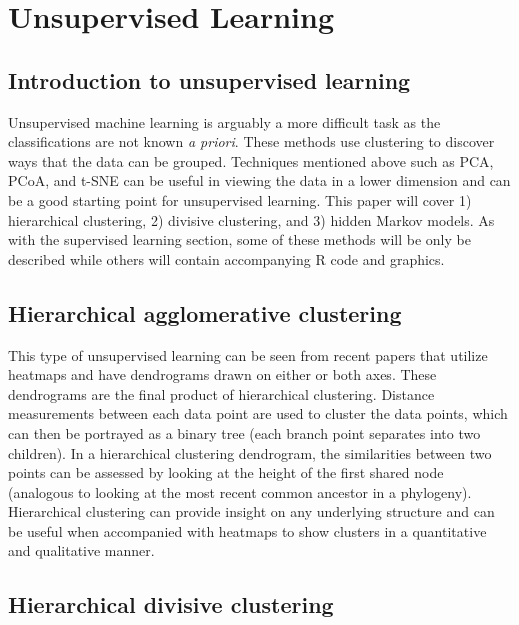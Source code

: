 \documentclass[12pt,openany]{book}
\begin{document}
\chapter{Unsupervised Learning}\label{unsup_learn}

\section{Introduction to unsupervised
learning}\label{introduction-to-unsupervised-learning}

Unsupervised machine learning is arguably a more difficult task as the
classifications are not known \emph{a priori}. These methods use
clustering to discover ways that the data can be grouped. Techniques
mentioned above such as PCA, PCoA, and t-SNE can be useful in viewing
the data in a lower dimension and can be a good starting point for
unsupervised learning. This paper will cover 1) hierarchical clustering,
2) divisive clustering, and 3) hidden Markov models. As with the
supervised learning section, some of these methods will be only be
described while others will contain accompanying R code and graphics.

\section{Hierarchical agglomerative
clustering}\label{hierarchical-agglomerative-clustering}

This type of unsupervised learning can be seen from recent papers that
utilize heatmaps and have dendrograms drawn on either or both axes.
These dendrograms are the final product of hierarchical clustering.
Distance measurements between each data point are used to cluster the
data points, which can then be portrayed as a binary tree (each branch
point separates into two children). In a hierarchical clustering
dendrogram, the similarities between two points can be assessed by
looking at the height of the first shared node (analogous to looking at
the most recent common ancestor in a phylogeny). Hierarchical clustering
can provide insight on any underlying structure and can be useful when
accompanied with heatmaps to show clusters in a quantitative and
qualitative manner.

\section{Hierarchical divisive
clustering}\label{hierarchical-divisive-clustering}
\end{document}
